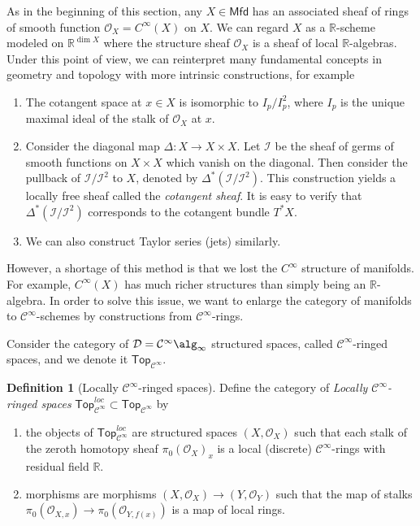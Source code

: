 \documentclass[12pt]{amsart}
\theoremstyle{definition}
\newtheorem{defn}[thm]{Definition}
\theoremstyle{remark}
\numberwithin{equation}{section}
\newcommand{\CO}{{\mathcal O}}
\newcommand{\cinf}{{\mathcal C}^{\infty}}
\newcommand{\R}{{\mathbb{R}}}
\newcommand{\1}{{\mathbb{1}}}
\newcommand{\mfd}{\mathsf{Mfd}}
\newcommand{\Top}{\mathsf{Top}}
\begin{document}
As in the beginning of this section, any $X\in \mfd$ has an associated sheaf of rings of smooth function $\CO_X=C^{\infty}(X)$ on $X$. We can regard $X$ as a $\R$-scheme modeled on $\R^{\dim X}$ where the structure sheaf $\CO_X$ is a sheaf of local $\R$-algebras. Under this point of view, we can reinterpret many fundamental concepts in geometry and topology with more intrinsic constructions, for example
\begin{enumerate}
	\item The cotangent space at $x\in X$ is isomorphic to $I_p/I_p^2$, where $I_p$ is the unique maximal ideal of the stalk of $\CO_X$ at $x$.
	\item Consider the diagonal map $\Delta: X\to X\times X$. Let $\mathcal{I}$ be the sheaf of germs of smooth functions on $X\times X$ which vanish on the diagonal. Then consider the pullback of $\mathcal{I}/\mathcal{I}^2$ to $X$, denoted by $ \Delta^*( \mathcal{I}/\mathcal{I}^2)$. This construction yields a locally free sheaf called the {\it cotangent sheaf}. It is easy to verify that $ \Delta^*( \mathcal{I}/\mathcal{I}^2)$ corresponds to the cotangent bundle $T^*X$.
	\item We can also construct Taylor series (jets) similarly.
\end{enumerate}

However, a shortage of this method is that we lost the $C^{\infty}$ structure of manifolds. For example, $C^{\infty}(X)$ has much richer structures than simply being an $\R$-algebra. In order to solve this issue, we want to enlarge the category of manifolds to $\cinf$-schemes by constructions from $\cinf$-rings.


Consider the category of $\mathcal{D}=\cinf\alg_{\infty}$ structured spaces, called $\cinf$-ringed spaces, and we denote it $\Top_{\cinf}$. 


\begin{defn}[Locally $\cinf$-ringed spaces]
	Define the category of {\it Locally $\cinf$-ringed spaces}\index{Locally $\cinf$-ringed spaces} $\Top_{\cinf}^{loc} \subset \Top_{\cinf}$ by
	\begin{enumerate}
		\item the objects of $\Top_{\cinf}^{loc}$ are structured spaces $(X,\CO_X)$ such that each stalk of the zeroth homotopy sheaf $\pi_0(\CO_X)_x$ is a local (discrete) $\cinf$-rings with residual field $\R$.
		\item  morphisms are morphisms $(X, \CO_X) \to (Y, \CO_Y)$ such that the map of stalks $\pi_0(\CO_{X,x})\to \pi_0 (\CO_{Y,f(x)})$ is a map of local rings. 
	\end{enumerate}
\end{defn}
\end{document}
